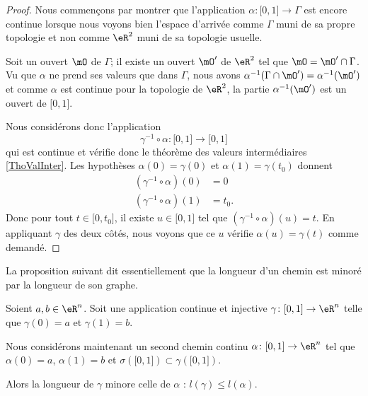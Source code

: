 \begin{proof}
	Nous commençons par montrer que l'application \( \alpha\colon \mathopen[ 0 , 1 \mathclose]\to \Gamma\) est encore continue lorsque nous voyons bien l'espace d'arrivée comme \( \Gamma\) muni de sa propre topologie et non comme \( \eR^2\) muni de sa topologie usuelle.

	Soit un ouvert \( \mO\) de \( \Gamma\); il existe un ouvert \( \mO'\) de \( \eR^2\) tel que \( \mO=\mO'\cap \Gamma\). Vu que \( \alpha\) ne prend ses valeurs que dans \( \Gamma\), nous avons \( \alpha^{-1}(\Gamma\cap \mO')=\alpha^{-1}(\mO')\) et comme \( \alpha\) est continue pour la topologie de \( \eR^2\), la partie \( \alpha^{-1}(\mO')\) est un ouvert de \( \mathopen[ 0 , 1 \mathclose]\).

	Nous considérons donc l'application
	\begin{equation}
		\gamma^{-1}\circ\alpha\colon \mathopen[ 0 , 1 \mathclose]\to \mathopen[ 0 , 1 \mathclose]
	\end{equation}
	qui est continue et vérifie donc le théorème des valeurs intermédiaires \ref{ThoValInter}. Les hypothèses \( \alpha(0)=\gamma(0)\) et \( \alpha(1)=\gamma(t_0)\) donnent
	\begin{subequations}
		\begin{align}
			(\gamma^{-1}\circ\alpha)(0) & =0    \\
			(\gamma^{-1}\circ\alpha)(1) & =t_0.
		\end{align}
	\end{subequations}
	Donc pour tout \( t\in \mathopen[ 0 , t_0 \mathclose]\), il existe \( u\in \mathopen[ 0 , 1 \mathclose]\) tel que \( (\gamma^{-1}\circ \alpha)(u)=t\). En appliquant \( \gamma\) des deux côtés, nous voyons que ce \( u\) vérifie \( \alpha(u)=\gamma(t)\) comme demandé.
\end{proof}

La proposition suivant dit essentiellement que la longueur d'un chemin est minoré par la longueur de son graphe.
\begin{proposition}      \label{PROPooXENVooMvkTZW}
	Soient \( a,b\in \eR^n\). Soit une application continue et injective \( \gamma\colon \mathopen[ 0 , 1 \mathclose]\to \eR^n\) telle que \( \gamma(0)=a\) et \( \gamma(1)=b\).

	Nous considérons maintenant un second chemin continu \( \alpha\colon \mathopen[ 0 , 1 \mathclose]\to \eR^n\) tel que \( \alpha(0)=a\), \( \alpha(1)=b\) et \( \sigma(\mathopen[ 0 , 1 \mathclose])\subset\gamma(\mathopen[ 0 , 1 \mathclose])\).

	Alors la longueur de \( \gamma\) minore celle de \( \alpha\) : \( l(\gamma)\leq l(\alpha)\).
\end{proposition}

